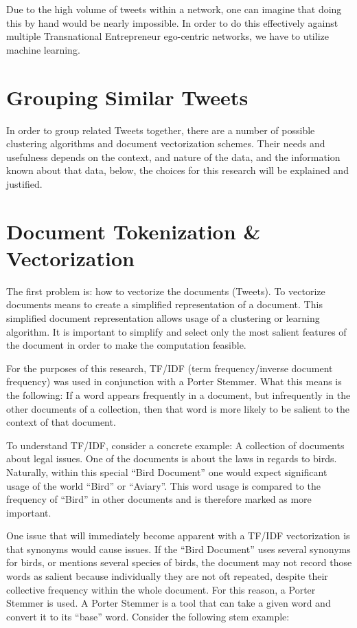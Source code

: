 Due to the high volume of tweets within a network, one can imagine
that doing this by hand would be nearly impossible. In order to do
this effectively against multiple Transnational Entrepreneur
ego-centric networks, we have to utilize machine learning.

\section{Grouping Similar Tweets}
In order to group related Tweets together, there are a number of
possible clustering algorithms and document vectorization
schemes. Their needs and usefulness depends on the context, and nature
of the data, and the information known about that data, below, the
choices for this research will be explained and justified.

\section{Document Tokenization \& Vectorization}
The first problem is: how to vectorize the documents (Tweets). To
vectorize documents means to create a simplified representation of a
document. This simplified document representation allows usage of a
clustering or learning algorithm. It is important to simplify and
select only the most salient features of the document in order to make
the computation feasible.

For the purposes of this research, TF/IDF (term frequency/inverse
document frequency) was used in conjunction with a Porter
Stemmer. What this means is the following: If a word appears
frequently in a document, but infrequently in the other documents of a
collection, then that word is more likely to be salient to the context
of that document.

To understand TF/IDF, consider a concrete example: A collection of
documents about legal issues. One of the documents is about the laws
in regards to birds. Naturally, within this special ``Bird Document''
one would expect significant usage of the world ``Bird'' or
``Aviary''. This word usage is compared to the frequency of ``Bird''
in other documents and is therefore marked as more important.

One issue that will immediately become apparent with a TF/IDF
vectorization is that synonyms would cause issues. If the ``Bird
Document'' uses several synonyms for birds, or mentions several
species of birds, the document may not record those words as salient
because individually they are not oft repeated, despite their
collective frequency within the whole document. For this reason,
a Porter Stemmer is used. A Porter Stemmer is a tool that can take
a given word and convert it to its ``base'' word. Consider the following
stem example:

